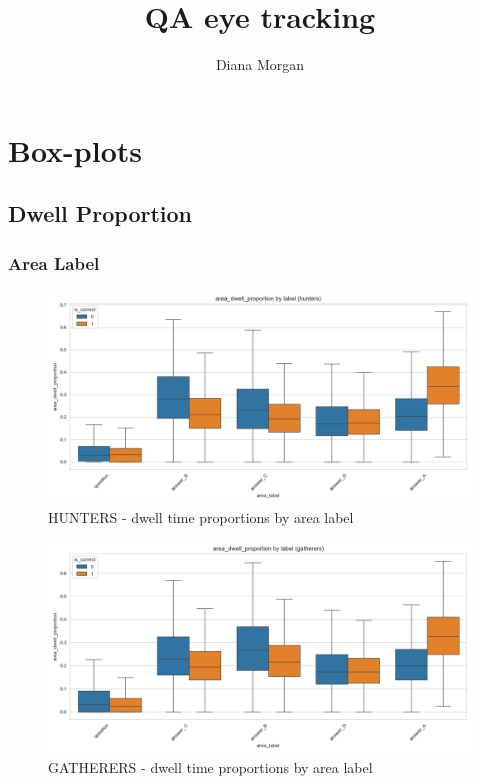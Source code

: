\documentclass{article}
\title{QA eye tracking}
\author{Diana Morgan }
\date{}
\begin{document}
\maketitle

\section{Box-plots}
\subsection{Dwell Proportion}
\subsubsection{Area Label}

\begin{figure}[H]
    \centering
    \includegraphics[width=0.8\linewidth]{plots/boxplots/boxplot_area_label_area_dwell_proportion_hunters.png}
    \caption{HUNTERS - dwell time proportions by area label}
    \label{fig:dp_hunt_al}
\end{figure}

\begin{figure}[H]
    \centering
    \includegraphics[width=0.8\linewidth]{plots/boxplots/boxplot_area_label_area_dwell_proportion_gatherers.png}
    \caption{GATHERERS - dwell time proportions by area label}
    \label{fig:dp_gath_al}
\end{figure}
\end{document}
